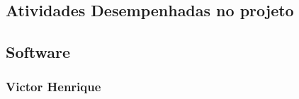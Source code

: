 \begin{apendicesenv}

\partapendices







\section{Atividades Desempenhadas no projeto}

\subsection{Software}

\subsubsection{Victor Henrique}


\end{apendicesenv}
